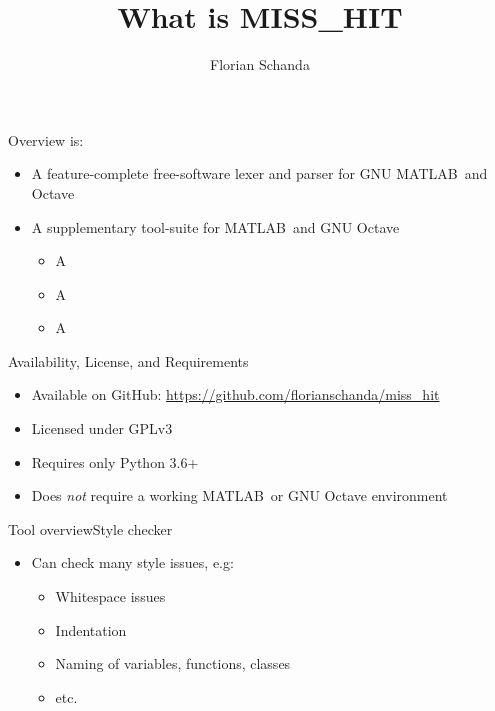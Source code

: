 \documentclass{beamer}
\author{Florian Schanda}
\title{What is MISS\_HIT}
\begin{document}
\maketitle

\begin{frame}{Overview}
   is:
  \begin{itemize}
  \item A feature-complete free-software lexer and parser for GNU MATLAB\texttrademark\ and Octave
    \pause
  \item A supplementary tool-suite for MATLAB\texttrademark\ and GNU
    Octave
    \begin{itemize}
    \item A 
    \item A 
    \item A 
    \end{itemize}
  \end{itemize}
\end{frame}

\begin{frame}{Availability, License, and Requirements}
  \begin{itemize}
  \item Available on GitHub: \url{https://github.com/florianschanda/miss_hit}
  \item Licensed under GPLv3
  \item Requires only Python 3.6+
  \item Does \emph{not} require a working MATLAB\texttrademark\ or GNU
    Octave environment
  \end{itemize}
\end{frame}

\begin{frame}{Tool overview}{Style checker}
  \begin{itemize}
  \item Can check many style issues, e.g:
    \begin{itemize}
    \item Whitespace issues
    \item Indentation
    \item Naming of variables, functions, classes
    \item etc.
    \end{itemize}
  \end{itemize}
\end{frame}
\end{document}
